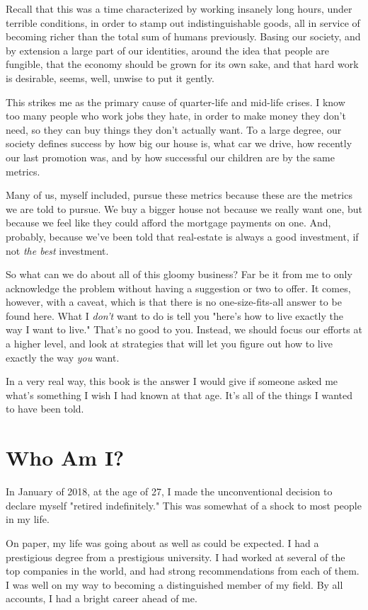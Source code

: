 \documentclass[./the-millions-of-gestures.tex]{subfiles}
\begin{document}
Recall that this was a time characterized by working insanely long hours, under
terrible conditions, in order to stamp out indistinguishable goods, all in
service of becoming richer than the total sum of humans previously. Basing our
society, and by extension a large part of our identities, around the idea that
people are fungible, that the economy should be grown for its own sake, and that
hard work is desirable, seems, well, unwise to put it gently.

This strikes me as the primary cause of quarter-life and mid-life crises. I know
too many people who work jobs they hate, in order to make money they don't need,
so they can buy things they don't actually want. To a large degree, our society
defines success by how big our house is, what car we drive, how recently our
last promotion was, and by how successful our children are by the same metrics.

Many of us, myself included, pursue these metrics because these are the metrics
we are told to pursue. We buy a bigger house not because we really want one, but
because we feel like they could afford the mortgage payments on one. And,
probably, because we've been told that real-estate is always a good investment,
if not \emph{the best} investment.

So what can we do about all of this gloomy business? Far be it from me to only
acknowledge the problem without having a suggestion or two to offer. It comes,
however, with a caveat, which is that there is no one-size-fits-all answer to be
found here. What I \emph{don't} want to do is tell you "here's how to live
exactly the way I want to live." That's no good to you. Instead, we should focus
our efforts at a higher level, and look at strategies that will let you figure
out how to live exactly the way \emph{you} want.

In a very real way, this book is the answer I would give if someone asked me
what's something I wish I had known at that age. It's all of the things I wanted
to have been told.

\section*{Who Am I?}

In January of 2018, at the age of 27, I made the unconventional decision to
declare myself "retired indefinitely." This was somewhat of a shock to most
people in my life.

On paper, my life was going about as well as could be expected. I had a
prestigious degree from a prestigious university. I had worked at several of the
top companies in the world, and had strong recommendations from each of them. I
was well on my way to becoming a distinguished member of my field. By all
accounts, I had a bright career ahead of me.
\end{document}
